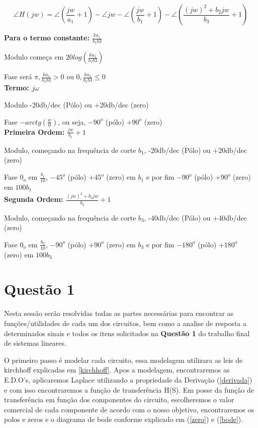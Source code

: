 \documentclass[a4paper, 12pt]{article}
\begin{document}
		\[
		\angle H(jw) = \angle (\frac{jw}{a_{1}}+1) - \angle jw - \angle (\frac{jw}{b_{1}}+1) - \angle (\frac{(jw)^{2} + b_{2}jw}{b_{3}}+1)
		\]
		
		\textbf{Para o termo constante: $\frac{ka_{1}}{b_{1}b{3}}$}
		
		Modulo começa em $20log(\frac{ka_{1}}{b_{1}b{3}})$ 
		
		Fase será $\pi, \frac{ka_{1}}{b_{1}b{3}} > 0$ ou $0, \frac{ka_{1}}{b_{1}b{3}} \leq 0$\\ 
		
		\textbf{Termo: $j\omega$} 
		
		Modulo -20db/dec (Pólo) ou +20db/dec (zero)
		
		Fase $-arctg(\frac{w}{0})$, ou seja, $-90^{o}$ (pólo) $+90^{o}$ (zero)\\
		
		\textbf{Primeira Ordem: $\frac{jw}{b_{1}}+1$} 
		
		Modulo, começando na frequência de corte $b_{1}$, -20db/dec (Pólo) ou +20db/dec (zero)
		
		Fase $0_{o}$ em $\frac{b_{1}}{10}$, $-45^{o}$ (pólo) $+45^{o}$ (zero) em $b_{1}$ e por fim $-90^{o}$ (pólo) $+90^{o}$ (zero) em $100b_{1}$\\
		
		\textbf{Segunda Ordem: $\frac{(jw)^{2} + b_{2}jw}{b_{3}}+1$} 
		
		Modulo, começando na frequência de corte $b_{3}$, -40db/dec (Pólo) ou +40db/dec (zero)
		
		Fase $0_{o}$ em $\frac{b_{3}}{10}$, $-90^{o}$ (pólo) $+90^{o}$ (zero) em $b_{3}$ e por fim $-180^{o}$ (pólo) $+180^{o}$ (zero) em $100b_{3}$\\		
	\newpage
	\section{Quest\~{a}o 1}
		Nesta sessão serão resolvidas todas as partes necessárias para encontrar as funções/utilidades de cada um dos circuitos, bem como a analise de resposta a determinados sinais e todos os itens solicitados na \textbf{Questão 1} do trabalho final de sistemas lineares.
		
		O primeiro passo é modelar cada circuito, essa modelagem utilizara as leis de kirchhoff explicadas em \ref{kirchhoff}. Apos a modelagem, encontraremos as E.D.O's, aplicaremos Laplace utilizando a propriedade da Derivação (\ref{derivada}) e com isso encontraremos a função de transferência H(S). Em posse da função de transferência em função dos componentes do circuito, escolheremos o valor comercial de cada componente de acordo com o nosso objetivo, encontraremos os polos e zeros e o diagrama de bode conforme explicado em (\ref{zero}) e (\ref{bode}).
\end{document}
